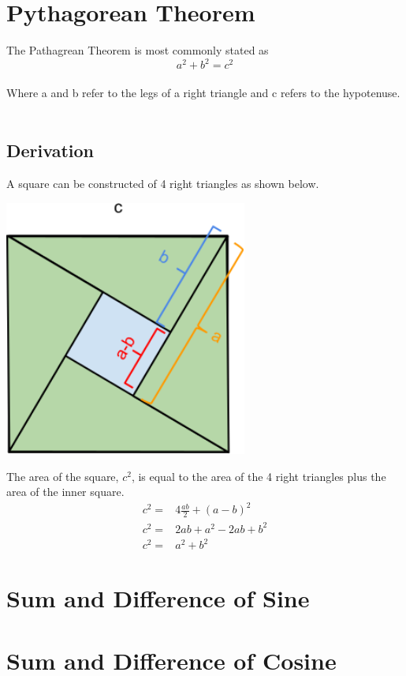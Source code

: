 \section{Pythagorean Theorem}
The Pathagrean Theorem is most commonly stated as
\[a^2 + b^2 = c^2\]
\\
Where a and b refer to the legs of a right triangle and c refers to the hypotenuse.\\
\\
\subsection{Derivation}
A square can be constructed of 4 right triangles as shown below.\\
\begin{center}
\includegraphics[width=8cm]{Trigonometry/pythagorus_diag1}
\end{center}
The area of the square, \(c^2\), is equal to the area of the 4 right triangles plus the area of the inner square.\\

\begin{align*}
c^2 =& 4\frac{ab}{2} + (a-b)^2\\
c^2 =& 2ab + a^2 -2ab + b^2 \\
c^2 =& a^2 + b^2
\end{align*}

\section{Sum and Difference of Sine}

\section{Sum and Difference of Cosine}

